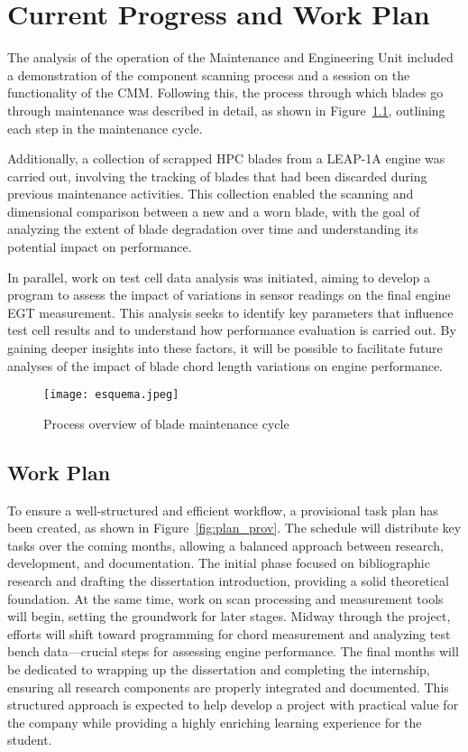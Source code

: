 \chapter{Current Progress and Work Plan}
\label{cha:planeamento}

The analysis of the operation of the Maintenance and Engineering Unit included a demonstration of the component scanning process and a session on the functionality of the \gls{CMM}. Following this, the process through which blades go through maintenance was described in detail, as shown in Figure~\ref{fig:esquema}, outlining each step in the maintenance cycle.

Additionally, a collection of scrapped \gls{HPC} blades from a \gls{LEAP}-1A engine was carried out, involving the tracking of blades that had been discarded during previous maintenance activities. This collection enabled the scanning and dimensional comparison between a new and a worn blade, with the goal of analyzing the extent of blade degradation over time and understanding its potential impact on performance.

In parallel, work on test cell data analysis was initiated, aiming to develop a program to assess the impact of variations in sensor readings on the final engine \gls{EGT} measurement. This analysis seeks to identify key parameters that influence test cell results and to understand how performance evaluation is carried out. By gaining deeper insights into these factors, it will be possible to facilitate future analyses of the impact of blade chord length variations on engine performance.

\begin{figure}[H]
    \centering
    \texttt{[image: esquema.jpeg]}
    \caption{Process overview of blade maintenance cycle}
    \label{fig:esquema}
\end{figure}

\section{Work Plan}
\label{sec:plano}

To ensure a well-structured and efficient workflow, a provisional task plan has been created, as shown in Figure~\ref{fig:plan_prov}. The schedule will distribute key tasks over the coming months, allowing a balanced approach between research, development, and documentation. The initial phase focused on bibliographic research and drafting the dissertation introduction, providing a solid theoretical foundation. At the same time, work on scan processing and measurement tools will begin, setting the groundwork for later stages. Midway through the project, efforts will shift toward programming for chord measurement and analyzing test bench data—crucial steps for assessing engine performance. The final months will be dedicated to wrapping up the dissertation and completing the internship, ensuring all research components are properly integrated and documented. This structured approach is expected to help develop a project with practical value for the company while providing a highly enriching learning experience for the student.

